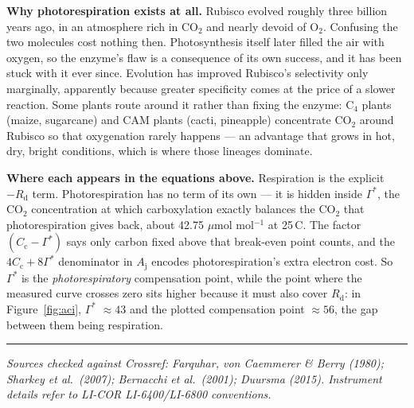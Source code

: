 \documentclass[11pt,letterpaper]{article}
\newcommand{\Rd}{\ensuremath{R_{\mathrm{d}}}}
\newcommand{\Cc}{\ensuremath{C_{\mathrm{c}}}}
\newcommand{\Gs}{\ensuremath{\Gamma^{*}}}
\newcommand{\umol}{\ensuremath{\mu}mol}
\begin{document}
\textbf{Why photorespiration exists at all.} Rubisco evolved roughly three
billion years ago, in an atmosphere rich in CO$_2$ and nearly devoid of O$_2$.
Confusing the two molecules cost nothing then. Photosynthesis itself later
filled the air with oxygen, so the enzyme's flaw is a consequence of its own
success, and it has been stuck with it ever since. Evolution has improved
Rubisco's selectivity only marginally, apparently because greater specificity
comes at the price of a slower reaction. Some plants route around it rather than
fixing the enzyme: C$_4$ plants (maize, sugarcane) and CAM plants (cacti,
pineapple) concentrate CO$_2$ around Rubisco so that oxygenation rarely happens
--- an advantage that grows in hot, dry, bright conditions, which is where those
lineages dominate.

\textbf{Where each appears in the equations above.} Respiration is the explicit
$-\Rd$ term. Photorespiration has no term of its own --- it is hidden inside
\Gs{}, the CO$_2$ concentration at which carboxylation exactly balances the
CO$_2$ that photorespiration gives back, about 42.75 \umol{} mol$^{-1}$ at
25\,\textdegree C. The factor $(\Cc - \Gs)$ says only carbon fixed above that
break-even point counts, and the $4\Cc + 8\Gs$ denominator in
$A_{\mathrm{j}}$ encodes photorespiration's extra electron cost. So \Gs{} is the
\emph{photorespiratory} compensation point, while the point where the measured
curve crosses zero sits higher because it must also cover \Rd{}: in
Figure~\ref{fig:aci}, \Gs{} $\approx 43$ and the plotted compensation point
$\approx 56$, the gap between them being respiration.

\vspace{2em}
{\noindent\color{rulegray}\rule{\textwidth}{0.4pt}\par}
\vspace{0.5em}
{\noindent\color{muted}\small\itshape Sources checked against Crossref: Farquhar,
von Caemmerer \& Berry (1980); Sharkey et al.\ (2007); Bernacchi et al.\ (2001);
Duursma (2015). Instrument details refer to LI-COR LI-6400/LI-6800 conventions.\par}
\end{document}
